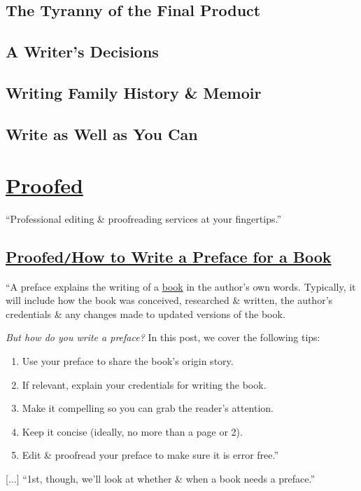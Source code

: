 \documentclass[oneside]{book}
\numberwithin{equation}{section}
\begin{document}
\section{The Tyranny of the Final Product}

\section{A Writer's Decisions}

\section{Writing Family History \& Memoir}

\section{Write as Well as You Can}


\chapter{\href{https://proofed.co.uk/}{Proofed}}

``Professional editing \& proofreading services at your fingertips.''

\section{\href{https://proofed.co.uk/writing-tips/how-to-write-a-preface-for-a-book/}{Proofed\texttt{/}How to Write a Preface for a Book}}
``A preface explains the writing of a \href{https://proofed.co.uk/author/book-editing-and-proofreading/}{book} in the author's own words. Typically, it will include how the book was conceived, researched \& written, the author's credentials \& any changes made to updated versions of the book.

\textit{But how do you write a preface?} In this post, we cover the following tips:
\begin{enumerate}
	\item Use your preface to share the book's origin story.
	\item If relevant, explain your credentials for writing the book.
	\item Make it compelling so you can grab the reader's attention.
	\item Keep it concise (ideally, no more than a page or 2).
	\item Edit \& proofread your preface to make sure it is error free.''
\end{enumerate}
[$\ldots$] ``1st, though, we'll look at whether \& when a book needs a preface.''
\end{document}
